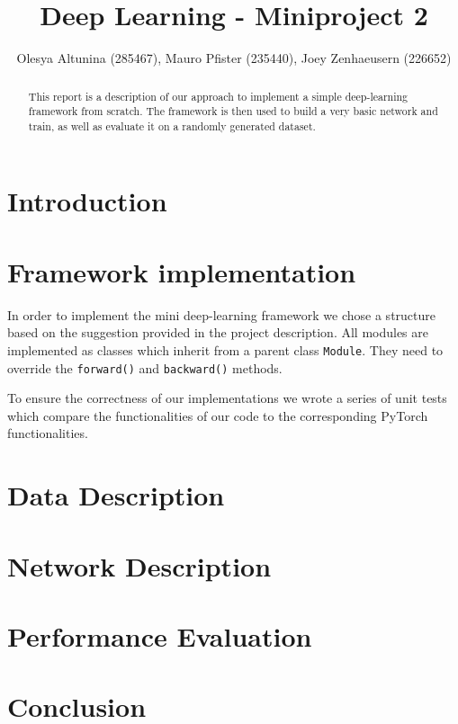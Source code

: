 \documentclass[10pt,conference,compsocconf]{IEEEtran}
\begin{document}
\title{Deep Learning - Miniproject 2}

\author{
  Olesya Altunina (285467), Mauro Pfister (235440), Joey Zenhaeusern (226652)
}

\maketitle

\begin{abstract}
This report is a description of our approach to implement a simple deep-learning framework from scratch. The framework is then used to build a very basic network and train, as well as evaluate it on a randomly generated dataset.
\end{abstract}

\section{Introduction}

\section{Framework implementation}
In order to implement the mini deep-learning framework we chose a structure based on the suggestion provided in the project description. All modules are implemented as classes which inherit from a parent class \texttt{Module}. They need to override the \texttt{forward()} and \texttt{backward()} methods.


To ensure the correctness of our implementations we wrote a series of unit tests which compare the functionalities of our code to the corresponding PyTorch functionalities.

\section{Data Description}

\section{Network Description}

\section{Performance Evaluation}

\section{Conclusion}




\end{document}
